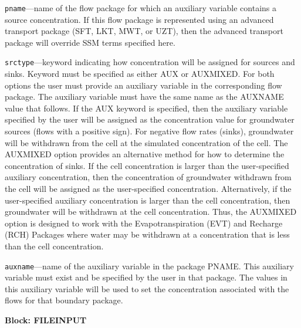 \begin{description}
\item \texttt{pname}---name of the flow package for which an auxiliary variable contains a source concentration.  If this flow package is represented using an advanced transport package (SFT, LKT, MWT, or UZT), then the advanced transport package will override SSM terms specified here.

\item \texttt{srctype}---keyword indicating how concentration will be assigned for sources and sinks.  Keyword must be specified as either AUX or AUXMIXED.  For both options the user must provide an auxiliary variable in the corresponding flow package.  The auxiliary variable must have the same name as the AUXNAME value that follows.  If the AUX keyword is specified, then the auxiliary variable specified by the user will be assigned as the concentration value for groundwater sources (flows with a positive sign).  For negative flow rates (sinks), groundwater will be withdrawn from the cell at the simulated concentration of the cell.  The AUXMIXED option provides an alternative method for how to determine the concentration of sinks.  If the cell concentration is larger than the user-specified auxiliary concentration, then the concentration of groundwater withdrawn from the cell will be assigned as the user-specified concentration.  Alternatively, if the user-specified auxiliary concentration is larger than the cell concentration, then groundwater will be withdrawn at the cell concentration.  Thus, the AUXMIXED option is designed to work with the Evapotranspiration (EVT) and Recharge (RCH) Packages where water may be withdrawn at a concentration that is less than the cell concentration.

\item \texttt{auxname}---name of the auxiliary variable in the package PNAME.  This auxiliary variable must exist and be specified by the user in that package.  The values in this auxiliary variable will be used to set the concentration associated with the flows for that boundary package.

\end{description}
\item \textbf{Block: FILEINPUT}

